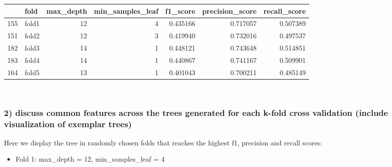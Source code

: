 \documentclass[11pt]{article}
\providecommand{\tightlist}{%
      \setlength{\itemsep}{0pt}\setlength{\parskip}{0pt}}
\begin{document}
\begin{tabular}{|l|l|r|r|r|r|r|}
	\toprule
	{} &   fold &  max\_depth &  min\_samples\_leaf &  f1\_score &  precision\_score &  recall\_score \\
	\midrule
	155 &  fold1 &         12 &                 4 &  0.435166 &         0.717057 &      0.507389 \\
	151 &  fold2 &         12 &                 3 &  0.419940 &         0.732016 &      0.497537 \\
	182 &  fold3 &         14 &                 1 &  0.448121 &         0.743648 &      0.514851 \\
	183 &  fold4 &         14 &                 1 &  0.440867 &         0.741167 &      0.509901 \\
	164 &  fold5 &         13 &                 1 &  0.401043 &         0.700211 &      0.485149 \\
	\bottomrule
\end{tabular}



    \begin{center}
    \end{center}
    { \hspace*{\fill} \\}
    
    \subsubsection*{2) discuss common features across the trees generated for
each k-fold cross validation (include visualization of exemplar
trees)}\label{discuss-common-features-across-the-trees-generated-for-each-k-fold-cross-validation-include-visualization-of-exemplar-trees}

    Here we display the tree in randomly chosen folds that reaches the
highest f1, precision and recall scores:

    \begin{itemize}
\tightlist
\item
  Fold 1: max\_depth = 12, min\_samples\_leaf = 4
\end{itemize}
\end{document}
